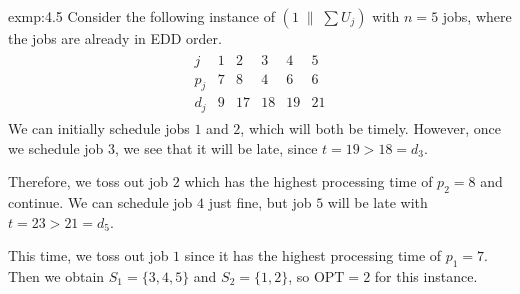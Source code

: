 \begin{exmp}{exmp:4.5}
    Consider the following instance of $(1 \;\|\; \sum U_j)$ with $n = 5$ jobs, 
    where the jobs are already in EDD order.  
    \begin{align*}
        \begin{array}{c|ccccc}
            j   & 1 & 2  & 3  & 4  & 5 \\ \hline 
            p_j & 7 & 8  & 4  & 6  & 6 \\ 
            d_j & 9 & 17 & 18 & 19 & 21
        \end{array}
    \end{align*}
    We can initially schedule jobs $1$ and $2$, which will both be timely. However, 
    once we schedule job $3$, we see that it will be late, since $t = 19 > 18 = d_3$.
    \begin{center} 
    \end{center}
    \vspace{-0.6cm}
    Therefore, we toss out job $2$ which has the highest processing time of $p_2 = 8$
    and continue. We can schedule job $4$ just fine, but job $5$ will be late with 
    $t = 23 > 21 = d_5$. 
    \begin{center} 
    \end{center}
    \vspace{-0.6cm}
    This time, we toss out job $1$ since it has the highest processing time of $p_1 = 7$. 
    Then we obtain $S_1 = \{3, 4, 5\}$ and $S_2 = \{1, 2\}$, so $\text{OPT} = 2$ for 
    this instance. 
\end{exmp}

